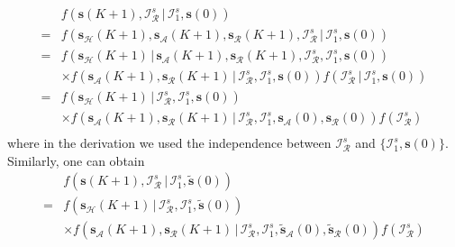 \documentclass{IEEEtran}
\begin{document}
\begin{equation}
	\begin{aligned}
		& f(\mathbf{s}(K+1), \mathcal{I}_{\mathcal{R}}^s \, | \, \mathcal{I}_1^s, \mathbf{s}(0)) \\
		= & f(\mathbf{s}_{\mathcal{H}}(K+1), \mathbf{s}_{\mathcal{A}}(K+1), \mathbf{s}_{\mathcal{R}}(K+1), \mathcal{I}_{\mathcal{R}}^s \, | \, \mathcal{I}_1^s, \mathbf{s}(0)) \\
		= & f(\mathbf{s}_{\mathcal{H}}(K+1) \, | \, \mathbf{s}_{\mathcal{A}}(K+1), \mathbf{s}_{\mathcal{R}}(K+1), \mathcal{I}_{\mathcal{R}}^s, \mathcal{I}_1^s, \mathbf{s}(0)) \\
		& \times f(\mathbf{s}_{\mathcal{A}}(K+1), \mathbf{s}_{\mathcal{R}}(K+1) \, | \, \mathcal{I}_{\mathcal{R}}^s, \mathcal{I}_1^s, \mathbf{s}(0)) 
		 f(\mathcal{I}_{\mathcal{R}}^s \, | \, \mathcal{I}_1^s,\mathbf{s}(0)) \\
		= & f(\mathbf{s}_{\mathcal{H}}(K+1) \, | \, \mathcal{I}_{\mathcal{R}}^s, \mathcal{I}_1^s, \mathbf{s}(0)) \\
		& \times f(\mathbf{s}_{\mathcal{A}}(K+1), \mathbf{s}_{\mathcal{R}}(K+1) \, | \, \mathcal{I}_{\mathcal{R}}^s, \mathcal{I}_1^s, \mathbf{s}_{\mathcal{A}}(0), \mathbf{s}_{\mathcal{R}}(0)) f(\mathcal{I}_{\mathcal{R}}^s) \\ 
	\end{aligned} 
\end{equation}
where in the derivation we used the independence between $\mathcal{I}_{\mathcal{R}}^s$ and $\{\mathcal{I}_1^s, \mathbf{s}(0)\}$. Similarly, one can obtain
\begin{equation}
	\begin{aligned}
		& f(\mathbf{s}(K+1), \mathcal{I}_{\mathcal{R}}^s \, | \, \mathcal{I}_1^s,\tilde{\mathbf{s}}(0)) \\
		= & f(\mathbf{s}_{\mathcal{H}}(K+1) \, | \, \mathcal{I}_{\mathcal{R}}^s, \mathcal{I}_1^s, \tilde{\mathbf{s}}(0))\\
		& \times f(\mathbf{s}_{\mathcal{A}}(K+1), \mathbf{s}_{\mathcal{R}}(K+1) \, | \, \mathcal{I}_{\mathcal{R}}^s, \mathcal{I}_1^s, \tilde{\mathbf{s}}_{\mathcal{A}}(0), \tilde{\mathbf{s}}_{\mathcal{R}}(0)) f(\mathcal{I}_{\mathcal{R}}^s) \\ 
	\end{aligned} 
\end{equation}
\end{document}
